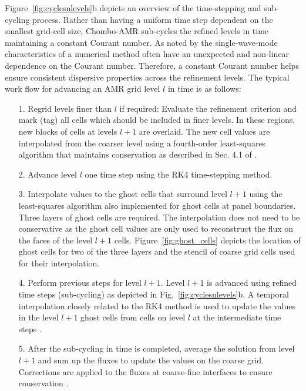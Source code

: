 Figure~\ref{fig:cyclesnlevels}b depicts an overview of the time-stepping and 
sub-cycling process. Rather than having a uniform
time step dependent on the smallest grid-cell size, Chombo-AMR
sub-cycles the refined levels in time maintaining a constant Courant
number.  As noted by \cite{ullrich2014understand} the single-wave-mode characteristics of a numerical method often have an
unexpected and non-linear dependence on the Courant number.
Therefore, a constant Courant number helps ensure consistent dispersive
properties across the refinement levels. 
The typical work flow for advancing an AMR grid level $l$ in time is as
follows:
\begin{itemize}
    \item[1.]
        Regrid levels finer than $l$ if required:  \newline Evaluate the refinement criterion
        and mark (tag) all cells which should be included in finer levels.
        In these regions, new blocks of cells at levels $l+1$ are
        overlaid.  The new cell values are interpolated from the coarser
        level using a fourth-order least-squares algorithm that maintains
        conservation as described in Sec. 4.1 of \cite{mccorquodale2015adaptive}.
    \item[2.]
        Advance level $l$ one time step using the RK4 time-stepping
        method.
    \item[3.]
        Interpolate values to the ghost cells that surround level $l+1$
        using the least-squares algorithm also implemented for ghost cells 
        at panel boundaries. Three layers of ghost cells
        are required.  The interpolation does not need to be
        conservative as the ghost cell values are only used to
        reconstruct the flux on the faces of the level $l+1$ cells.
        Figure~\ref{fig:ghost_cells} depicts the location of ghost cells for 
        two of the three layers and the stencil of coarse grid cells used 
        for their interpolation.
    \item[4.]
        Perform previous steps for level $l+1$.  Level $l+1$ is
        advanced using refined time steps (sub-cycling) as depicted in
        Fig.~\ref{fig:cyclesnlevels}b.  A temporal interpolation closely
        related to the RK4 method is used to update the values in the 
        level $l+1$ ghost cells from cells on level $l$ at the intermediate time
        steps \citep{mccorquodale2015adaptive}.
    \item[5.]
        After the sub-cycling in time is completed, average the solution
        from level $l+1$ and sum up the fluxes to update the values on
        the coarse grid.  Corrections are applied to the fluxes at
        coarse-fine interfaces to ensure conservation \citep{berger1989local}.
\end{itemize}

